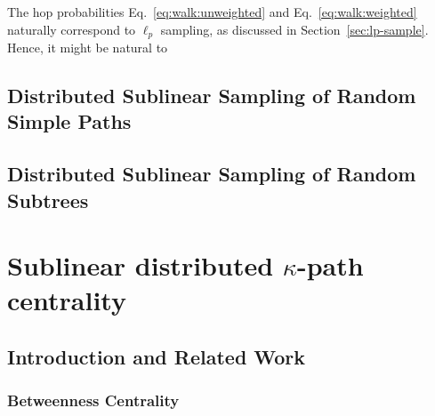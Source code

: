 \documentclass{report}
\begin{document}
The hop probabilities Eq.~\eqref{eq:walk:unweighted} and Eq.~\ref{eq:walk:weighted} naturally correspond to $\ell_p$ sampling, as discussed in Section~\ref{sec:lp-sample}.
Hence, it might be natural to 

\section{Distributed Sublinear Sampling of Random Simple Paths}
 \label{walks:sec:paths}


\section{Distributed Sublinear Sampling of Random Subtrees}
 \label{walks:sec:trees}




\chapter{Sublinear distributed $\kappa$-path centrality}
 \label{chap:kpath}


\section{Introduction and Related Work}
 \label{kpath:sec:intro}

\subsection{Betweenness Centrality} \label{sec:bc}
\end{document}
